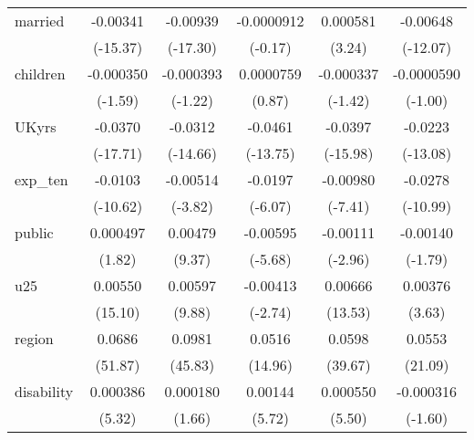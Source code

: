 {\begin{longtable}{l*{5}{c}}
married     &    -0.00341\sym{***}&    -0.00939\sym{***}&  -0.0000912         &    0.000581\sym{**} &    -0.00648\sym{***}\\
            &    (-15.37)         &    (-17.30)         &     (-0.17)         &      (3.24)         &    (-12.07)         \\
children    &   -0.000350         &   -0.000393         &   0.0000759         &   -0.000337         &  -0.0000590         \\
            &     (-1.59)         &     (-1.22)         &      (0.87)         &     (-1.42)         &     (-1.00)         \\
UKyrs       &     -0.0370\sym{***}&     -0.0312\sym{***}&     -0.0461\sym{***}&     -0.0397\sym{***}&     -0.0223\sym{***}\\
            &    (-17.71)         &    (-14.66)         &    (-13.75)         &    (-15.98)         &    (-13.08)         \\
exp\_ten     &     -0.0103\sym{***}&    -0.00514\sym{***}&     -0.0197\sym{***}&    -0.00980\sym{***}&     -0.0278\sym{***}\\
            &    (-10.62)         &     (-3.82)         &     (-6.07)         &     (-7.41)         &    (-10.99)         \\
public      &    0.000497         &     0.00479\sym{***}&    -0.00595\sym{***}&    -0.00111\sym{**} &    -0.00140         \\
            &      (1.82)         &      (9.37)         &     (-5.68)         &     (-2.96)         &     (-1.79)         \\
u25         &     0.00550\sym{***}&     0.00597\sym{***}&    -0.00413\sym{**} &     0.00666\sym{***}&     0.00376\sym{***}\\
            &     (15.10)         &      (9.88)         &     (-2.74)         &     (13.53)         &      (3.63)         \\
region      &      0.0686\sym{***}&      0.0981\sym{***}&      0.0516\sym{***}&      0.0598\sym{***}&      0.0553\sym{***}\\
            &     (51.87)         &     (45.83)         &     (14.96)         &     (39.67)         &     (21.09)         \\
disability  &    0.000386\sym{***}&    0.000180         &     0.00144\sym{***}&    0.000550\sym{***}&   -0.000316         \\
            &      (5.32)         &      (1.66)         &      (5.72)         &      (5.50)         &     (-1.60)         \\

\end{longtable}}
